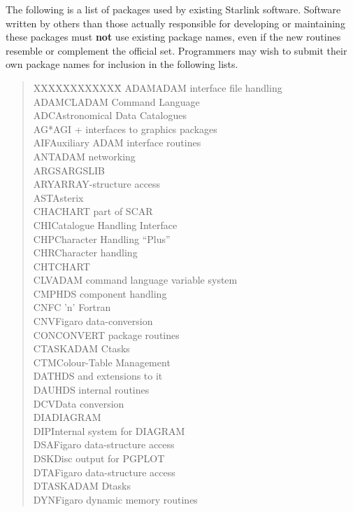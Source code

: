 \documentclass[twoside,11pt]{article}
\renewcommand{\_}{{\tt\char'137}}
\begin{document}
The following is a list of packages used by existing Starlink software.
Software written by others than those actually responsible for developing or
maintaining these packages must {\bf not} use existing package names, even if
the new routines resemble or complement the official set.
Programmers may wish to submit their own package names for inclusion in the
following lists.
\begin{quote}
\begin{tabbing}
XXXXXXXXXXXX\=\kill
ADAM\>ADAM interface file handling\\
ADAMCL\>ADAM Command Language\\
ADC\>Astronomical Data Catalogues\\
AG*\>AGI + interfaces to graphics packages\\
AIF\>Auxiliary ADAM interface routines\\
ANT\>ADAM networking\\
ARGS\>ARGSLIB\\
ARY\>ARRAY-structure access\\
AST\>Asterix\\
CHA\>CHART part of SCAR\\
CHI\>Catalogue Handling Interface\\
CHP\>Character Handling ``Plus''\\
CHR\>Character handling\\
CHT\>CHART\\
CLV\>ADAM command language variable system\\
CMP\>HDS component handling\\
CNF\>C 'n' Fortran\\
CNV\>Figaro data-conversion\\
CON\>CONVERT package routines\\
CTASK\>ADAM Ctasks\\
CTM\>Colour-Table Management\\
DAT\>HDS and extensions to it\\
DAU\>HDS internal routines\\
DCV\>Data conversion\\
DIA\>DIAGRAM\\
DIP\>Internal system for DIAGRAM\\
DSA\>Figaro data-structure access\\
DSK\>Disc output for PGPLOT\\
DTA\>Figaro data-structure access\\
DTASK\>ADAM Dtasks\\
DYN\>Figaro dynamic memory routines\\

\end{tabbing}
\end{quote}
\end{document}
